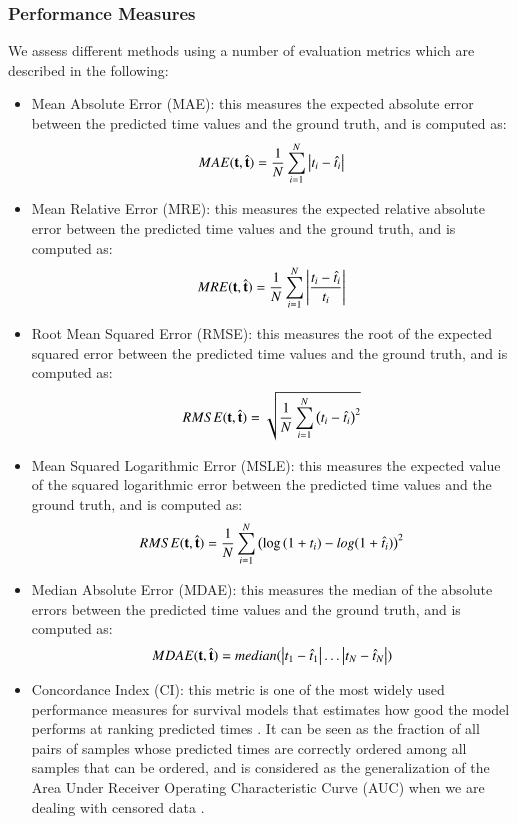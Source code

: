 \subsubsection{Performance Measures}
We assess different methods using a number of evaluation metrics which are described in the following:
\begin{itemize}
\item Mean Absolute Error (MAE): this measures the expected absolute error between the predicted time values and the ground truth, and is computed as:
\[MAE(\mathbf{t},\hat{\mathbf{t}}) = \frac{1}{N}\sum_{i=1}^{N}\left|t_i-\hat{t}_i\right|\]
\item Mean Relative Error (MRE): this measures the expected relative absolute error between the predicted time values and the ground truth, and is computed as:
\[MRE(\mathbf{t},\hat{\mathbf{t}}) = \frac{1}{N}\sum_{i=1}^{N}\left|\frac{t_i-\hat{t}_i}{t_i}\right|\]
\item Root Mean Squared Error (RMSE): this measures the root of the expected squared error between the predicted time values and the ground truth, and is computed as:
\[RMSE(\mathbf{t},\hat{\mathbf{t}}) = \sqrt{\frac{1}{N}\sum_{i=1}^{N}\left(t_i-\hat{t}_i\right)^2}\]
\item Mean Squared Logarithmic Error (MSLE): this measures the expected value of the squared logarithmic error between the predicted time values and the ground truth, and is computed as:
\[RMSE(\mathbf{t},\hat{\mathbf{t}}) = \frac{1}{N}\sum_{i=1}^{N}\left(\log{(1+t_i)}-log{(1+\hat{t}_i)}\right)^2\]
\item Median Absolute Error (MDAE): this measures the median of the absolute errors between the predicted time values and the ground truth, and is computed as:
\[MDAE(\mathbf{t},\hat{\mathbf{t}}) = median(\left|t_1-\hat{t}_1\right|\dots\left|t_N-\hat{t}_N\right|)\]
\item Concordance Index (CI): this metric is one of the most widely used performance measures for survival models that estimates how good the model performs at ranking predicted times \cite{harrell1982evaluating}. It can be seen as the fraction of all pairs of samples whose predicted times are correctly ordered among all samples that can be ordered, and is considered as the generalization of the Area Under Receiver Operating Characteristic Curve (AUC) when we are dealing with censored data \cite{steck2008ranking}.
\end{itemize}

